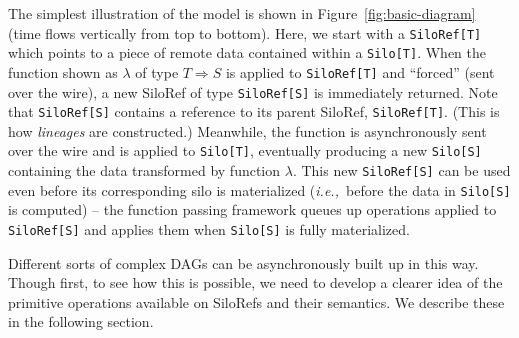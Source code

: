 \documentclass[preprint]{sigplanconf}
\theoremstyle{definition}
\theoremstyle{definition}
\newcommand{\ie}{{\em i.e.,~}}
\begin{document}
The simplest illustration of the model is shown in
Figure~\ref{fig:basic-diagram} (time flows vertically from top to bottom).
Here, we start with a \verb|SiloRef[T]| which points to a piece of remote data
contained within a \verb|Silo[T]|. When the function shown as $\lambda$ of type
$T \Rightarrow S$ is applied to \verb|SiloRef[T]| and ``forced'' (sent over the
wire), a new SiloRef of type \verb|SiloRef[S]| is immediately returned. Note
that \verb|SiloRef[S]| contains a reference to its parent SiloRef,
\verb|SiloRef[T]|. (This is how {\em lineages} are constructed.) Meanwhile, the
function is asynchronously sent over the wire and is  applied to 
\verb|Silo[T]|, eventually producing a new \verb|Silo[S]| containing the data 
transformed by function $\lambda$. This new \verb|SiloRef[S]| can be used even 
before its corresponding silo is materialized (\ie before the data in 
\verb|Silo[S]| is computed) – the function passing framework queues up 
operations applied to \verb|SiloRef[S]| and applies them when \verb|Silo[S]| is 
fully materialized.

Different sorts of complex DAGs can be asynchronously built up in this way.
Though first, to see how this is possible, we need to develop a clearer idea of
the primitive operations available on SiloRefs and their semantics. We describe
these in the following section. 
\end{document}
